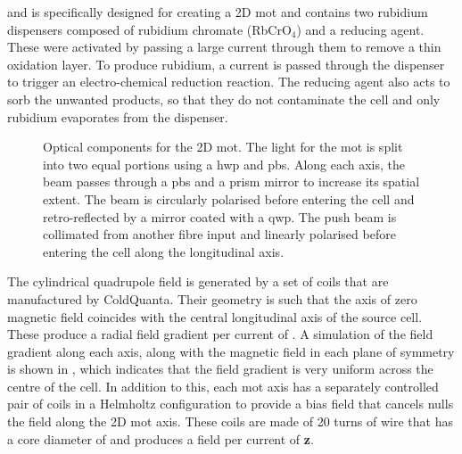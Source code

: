 \times {} \times {}\) and is
specifically designed for creating a 2D\+ \ac{mot} and contains two rubidium
dispensers composed of rubidium chromate (RbCrO\(_4\)) and a reducing agent.
These were activated by passing a large current through them to remove a thin
oxidation layer. To produce rubidium, a current is passed through the dispenser
to trigger an electro-chemical reduction reaction. The reducing agent also acts
to sorb the unwanted products, so that they do not contaminate the cell and only
rubidium evaporates from the dispenser.
\begin{figure}
	\centering
	\def\svgwidth{0.5\textwidth}
	
	\caption[Optical components for the 2D \ac{mot}]{Optical components for the 2D \ac{mot}. The light for the \ac{mot} is split into two equal portions using a \ac{hwp} and \ac{pbs}. Along each axis, the beam passes through a \ac{pbs} and a prism mirror to increase its spatial extent. The beam is circularly polarised before entering the cell and retro-reflected by a mirror coated with a \ac{qwp}. The push beam is collimated from another fibre input and linearly polarised before entering the cell along the longitudinal axis.}
	\label{fig:2D_mot_optics}
\end{figure}
\par\noindent The cylindrical quadrupole field is generated by a set of coils
that are manufactured by ColdQuanta. Their geometry is such that the axis of
zero magnetic field coincides with the central longitudinal axis of the source
cell. These produce a radial field gradient per current of
. A simulation of the field
gradient along each axis, along with the magnetic field in each plane of
symmetry is shown in , which indicates that
the field gradient is very uniform across the centre of the cell. In addition to
this, each \ac{mot} axis has a separately controlled pair of coils in a
Helmholtz configuration to provide a bias field that cancels nulls the field
along the 2D \ac{mot} axis. These coils are made of 20 turns of wire that has a
core diameter of  and produces a field per current of
	{\textbf{z}}\;\sivalue{}{\gauss\per\ampere}.
